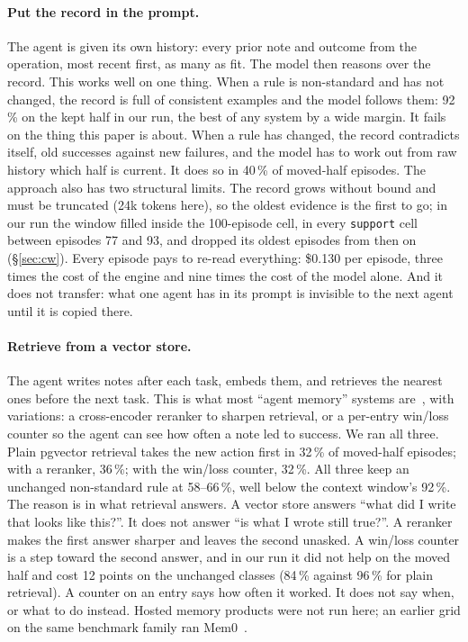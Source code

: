 \documentclass[11pt]{article}
\newcommand{\code}[1]{\texttt{#1}}
\begin{document}
\paragraph{Put the record in the prompt.} The agent is given its own history: every prior note
and outcome from the operation, most recent first, as many as fit. The model then reasons over
the record. This works well on one thing. When a rule is non-standard and has not changed, the
record is full of consistent examples and the model follows them: 92\,\% on the kept half in our
run, the best of any system by a wide margin. It fails on the thing this paper is about. When a
rule has changed, the record contradicts itself, old successes against new failures, and the
model has to work out from raw history which half is current. It does so in 40\,\% of moved-half
episodes. The approach also has two structural limits. The record grows without bound and must
be truncated (24k tokens here), so the oldest evidence is the first to go; in our run the window
filled inside the 100-episode cell, in every \code{support} cell between episodes 77 and 93,
and dropped its oldest episodes from then on (\S\ref{sec:cw}). Every episode pays to re-read
everything: \$0.130 per episode, three times the cost of the engine and nine times the cost of
the model alone. And it does not transfer: what one agent has in its prompt is invisible to the
next agent until it is copied there.

\paragraph{Retrieve from a vector store.} The agent writes notes after each task, embeds them,
and retrieves the nearest ones before the next task. This is what most ``agent memory'' systems
are~\cite{reflexion,expel,awm}, with variations: a cross-encoder reranker to sharpen retrieval, or a per-entry win/loss
counter so the agent can see how often a note led to success. We ran all three. Plain pgvector
retrieval takes the new action first in 32\,\% of moved-half episodes; with a reranker, 36\,\%;
with the win/loss counter, 32\,\%. All three keep an unchanged non-standard rule at 58--66\,\%,
well below the context window's 92\,\%. The reason is in what retrieval answers. A vector store
answers ``what did I write that looks like this?''. It does not answer ``is what I wrote still
true?''. A reranker makes the first answer sharper and leaves the second unasked. A win/loss
counter is a step toward the second answer, and in our run it did not help on the moved half and
cost 12 points on the unchanged classes (84\,\% against 96\,\% for plain retrieval). A counter on
an entry says how often it worked. It does not say when, or what to do instead. Hosted memory
products were not run here; an earlier grid on the same benchmark family ran
Mem0~\cite{senselab-cl}.
\end{document}

